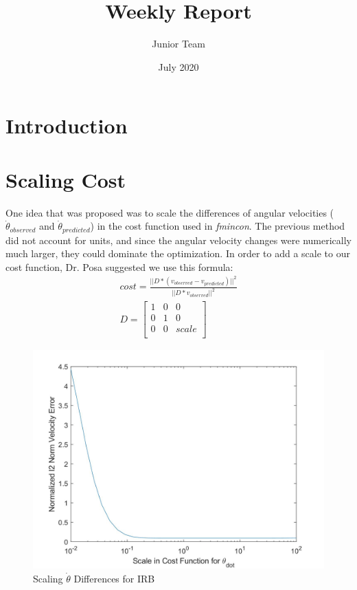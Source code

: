 \documentclass{article}
\title{Weekly Report}
\author{Junior Team }
\date{July 2020}
\begin{document}
\maketitle

\section*{Introduction}

\section{Scaling Cost}
One idea that was proposed was to scale the differences of angular velocities ($\dot{\theta}_{observed}$ and $\dot{\theta}_{predicted}$) in the cost function used in \textit{fmincon}. The previous method did not account for units, and since the angular velocity changes were numerically much larger, they could dominate the optimization. In order to add a scale to our cost function, Dr. Posa suggested we use this formula:
\begin{gather}
cost = \frac{|| D *(v_{observed} - v_{predicted})||^2}{||D * v_{observed}||^2} \\[2ex]
D = 
    \left [
        \begin{array}{ccc}
             1 & 0 & 0\\
             0 & 1 & 0\\
             0 & 0 & scale\\
        \end{array} 
    \right ]
\end{gather}
\begin{figure}[h!]
\centering
\includegraphics[scale=0.15]{scaled.jpg}
\caption{Scaling $\dot{\theta}$ Differences for IRB}
\label{fig:scaled}
\end{figure}
\end{document}
